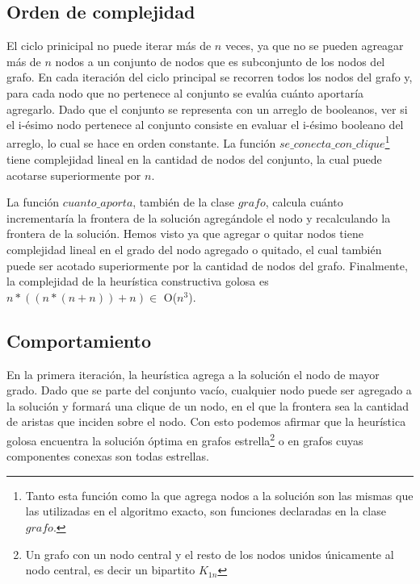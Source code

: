 \subsection{Orden de complejidad}

\par{El ciclo prinicipal no puede iterar más de $n$ veces, ya que no se pueden
agreagar más de $n$ nodos a un conjunto de nodos que es subconjunto de los
nodos del grafo. En cada iteración del ciclo principal se recorren todos los
nodos del grafo y, para cada nodo que no pertenece al conjunto se evalúa
cuánto aportaría agregarlo. Dado que el conjunto se representa con un
arreglo de booleanos, ver si el i-ésimo nodo pertenece al conjunto consiste
en evaluar el i-ésimo booleano del arreglo, lo cual se hace en orden constante.
La función $se\_conecta\_con\_clique$\footnote{Tanto esta función como la que
agrega nodos a la solución son las mismas que las utilizadas en el algoritmo
exacto, son funciones declaradas en la clase $grafo$.} tiene complejidad
lineal en la cantidad de nodos del conjunto, la cual puede acotarse
superiormente por $n$.}\\

\par{La función $cuanto\_aporta$, también de la clase $grafo$, calcula
cuánto incrementaría la frontera de la solución agregándole el nodo y
recalculando la frontera de la solución. Hemos visto ya que agregar o quitar
nodos tiene complejidad lineal en el grado del nodo agregado o quitado, el
cual también puede ser acotado superiormente por la cantidad de nodos del
grafo. Finalmente, la complejidad de la heurística constructiva golosa es
$n * ((n * (n+n)) + n) \in$ O($n^3$).}

\subsection{Comportamiento}

\par{En la primera iteración, la heurística agrega a la solución el nodo
de mayor grado. Dado que se parte del conjunto vacío, cualquier nodo
puede ser agregado a la solución y formará una clique de un nodo, en el
que la frontera sea la cantidad de aristas que inciden sobre el nodo. Con
esto podemos afirmar que la heurística golosa encuentra la solución óptima
en grafos estrella\footnote{Un grafo con un nodo central y el resto de los
nodos unidos únicamente al nodo central, es decir un bipartito $K_{1n}$} o
en grafos cuyas componentes conexas son todas estrellas.}\\

